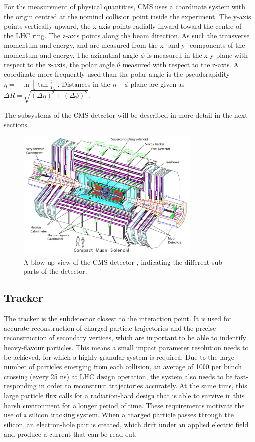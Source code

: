 For the measurement of physical quantities, \ac{CMS} uses a coordinate
system with the origin centred at the nominal collision point
inside the experiment. The y-axis points vertically upward, the x-axis
points radially inward toward the centre of the \ac{LHC} ring. The z-axis
points along the beam direction. As such the transverse momentum and energy, 
\pT and \ET are measured from the x- and y- components of the momentum and energy.
The azimuthal angle $\phi$ is measured in the x-y plane with respect to the x-axis, 
the polar angle $\theta$ measured with respect to the z-axis. A coordinate
more frequently used than the polar angle is the pseudorapidity $\eta = -\ln{[\tan{\frac{\theta}{2}}]}$.
Distances in the $\eta-\phi$ plane are given as $\Delta R = \sqrt{(\Delta\eta)^2+(\Delta\phi)^2}$. 

The subsystems of the \ac{CMS} detector will be described in more detail in the 
next sections.

\begin{figure}[h!]
\includegraphics[width=0.8\textwidth]{./Detector/Plots/cms.png}
\caption{A blow-up view of the \ac{CMS} detector \cite{cms-jinst}, indicating the
different sub-parts of the detector.}
\label{fig:cms_detector}
\end{figure}

\subsection{Tracker}
\label{sec:CMSLHC_CMS_tracker}
The tracker \cite{cms-jinst} is the subdetector closest to the interaction point. It
is used for accurate reconstruction of charged particle trajectories and 
the precise reconstruction of secondary vertices, which are important to be
able to indentify heavy-flavour particles. This means a small impact parameter
resolution needs to be achieved, for which a highly granular system is required. 
Due to the large number of particles emerging from 
each collision, an average of 1000 per bunch crossing (every 25 ns) at LHC design operation, the 
system also needs to be fast-responding in order to reconstruct trajectories accurately.
At the same time, this large particle flux calls for a 
radiation-hard design that is able to survive in this harsh environment
for a longer period of time. These requirements motivate the use of a silicon tracking
system. When a charged particle passes through the silicon, an electron-hole pair
is created, which drift under an applied electric field and produce a current
that can be read out. %

